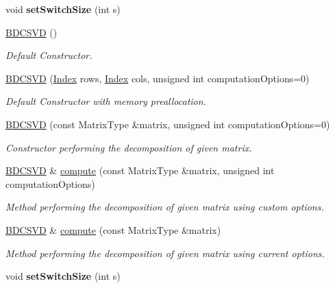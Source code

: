 \begin{DoxyCompactItemize}
\mbox{\label{group___s_v_d___module_aa21c0cc5e99c861970bae45d94cae9ad}} 
void {\bfseries set\+Switch\+Size} (int s)
\item 
\hyperlink{group___s_v_d___module_a39514816d38f9c418cf3f3514b511c2c}{B\+D\+C\+S\+VD} ()
\begin{DoxyCompactList}\small\item\em Default Constructor. \end{DoxyCompactList}\item 
\hyperlink{group___s_v_d___module_a3e1fa48b3d042b7daf7392724a68bb60}{B\+D\+C\+S\+VD} (\hyperlink{group___s_v_d___module_a6229a37997eca1072b52cca5ee7a2bec}{Index} rows, \hyperlink{group___s_v_d___module_a6229a37997eca1072b52cca5ee7a2bec}{Index} cols, unsigned int computation\+Options=0)
\begin{DoxyCompactList}\small\item\em Default Constructor with memory preallocation. \end{DoxyCompactList}\item 
\hyperlink{group___s_v_d___module_a302746d9c534cd513c1df87c7ae4850d}{B\+D\+C\+S\+VD} (const Matrix\+Type \&matrix, unsigned int computation\+Options=0)
\begin{DoxyCompactList}\small\item\em Constructor performing the decomposition of given matrix. \end{DoxyCompactList}\item 
\hyperlink{group___s_v_d___module_class_eigen_1_1_b_d_c_s_v_d}{B\+D\+C\+S\+VD} \& \hyperlink{group___s_v_d___module_a76d4ba0d8c9693687b8f182adbf08433}{compute} (const Matrix\+Type \&matrix, unsigned int computation\+Options)
\begin{DoxyCompactList}\small\item\em Method performing the decomposition of given matrix using custom options. \end{DoxyCompactList}\item 
\hyperlink{group___s_v_d___module_class_eigen_1_1_b_d_c_s_v_d}{B\+D\+C\+S\+VD} \& \hyperlink{group___s_v_d___module_acf27f41ed044d74ea8e8cbaf17ffdb04}{compute} (const Matrix\+Type \&matrix)
\begin{DoxyCompactList}\small\item\em Method performing the decomposition of given matrix using current options. \end{DoxyCompactList}\item 
\mbox{\label{group___s_v_d___module_aa21c0cc5e99c861970bae45d94cae9ad}} 
void {\bfseries set\+Switch\+Size} (int s)
\end{DoxyCompactItemize}
